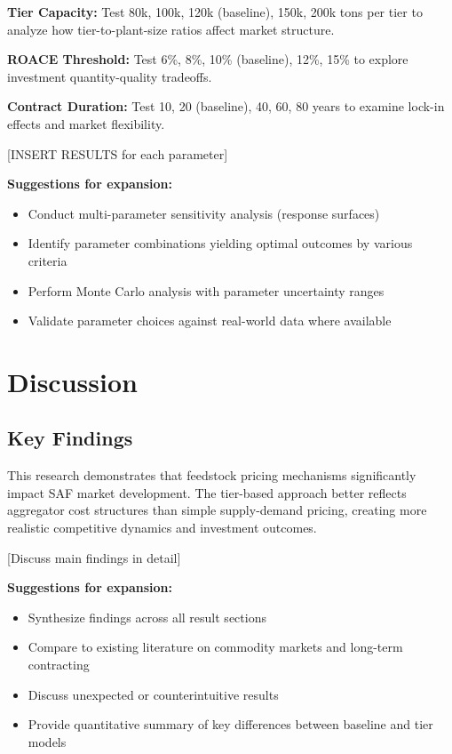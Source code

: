 \documentclass[10.5pt]{article}
\begin{document}
\textbf{Tier Capacity:} Test 80k, 100k, 120k (baseline), 150k, 200k tons per tier to analyze how tier-to-plant-size ratios affect market structure.

\textbf{ROACE Threshold:} Test 6\%, 8\%, 10\% (baseline), 12\%, 15\% to explore investment quantity-quality tradeoffs.

\textbf{Contract Duration:} Test 10, 20 (baseline), 40, 60, 80 years to examine lock-in effects and market flexibility.

[INSERT RESULTS for each parameter]

\textbf{Suggestions for expansion:}
\begin{itemize}
    \item Conduct multi-parameter sensitivity analysis (response surfaces)
    \item Identify parameter combinations yielding optimal outcomes by various criteria
    \item Perform Monte Carlo analysis with parameter uncertainty ranges
    \item Validate parameter choices against real-world data where available
\end{itemize}

\newpage
\section{Discussion}

\subsection{Key Findings}

This research demonstrates that feedstock pricing mechanisms significantly impact SAF market development. The tier-based approach better reflects aggregator cost structures than simple supply-demand pricing, creating more realistic competitive dynamics and investment outcomes.

[Discuss main findings in detail]

\textbf{Suggestions for expansion:}
\begin{itemize}
    \item Synthesize findings across all result sections
    \item Compare to existing literature on commodity markets and long-term contracting
    \item Discuss unexpected or counterintuitive results
    \item Provide quantitative summary of key differences between baseline and tier models
\end{itemize}
\end{document}
